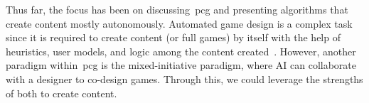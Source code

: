 Thus far, the focus has been on discussing~\acrshort{pcg} and presenting algorithms that create content mostly autonomously. Automated game design is a complex task since it is required to create content (or full games) by itself with the help of heuristics, user models, and logic among the content created~\cite{togelius_experiment_2008,barros_who_2019,cook_angelina_2016,cook_getting_2020}. However, another paradigm within~\acrshort{pcg} is the mixed-initiative paradigm, where AI can collaborate with a designer to co-design games. Through this, we could leverage the strengths of both to create content.




 


